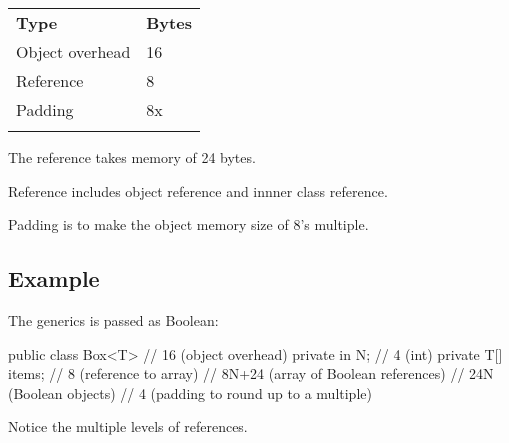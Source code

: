 \begin{tabular}{ll}
\hline\noalign{\smallskip}
\textbf{Type} & \textbf{Bytes} \\
\noalign{\smallskip}\hline\noalign{\smallskip}

Object overhead & 16 \\
Reference & 8 \\
Padding & 8x \\

\noalign{\smallskip}\hline\noalign{\smallskip}
\caption{for objects}
\end{tabular}

The reference takes memory of 24 bytes. 

Reference includes object reference and innner class reference.

Padding is to make the object memory size of 8's multiple.
\subsection{Example}
The generics is passed as Boolean:
\begin{java}
public class Box<T> {   // 16 (object overhead)
    private in N;       // 4 (int)
    private T[] items;  // 8 (reference to array)
                        // 8N+24 (array of Boolean references)
                        // 24N (Boolean objects)
                        // 4 (padding to round up to a multiple)
}
\end{java} 

Notice the multiple levels of references. 
